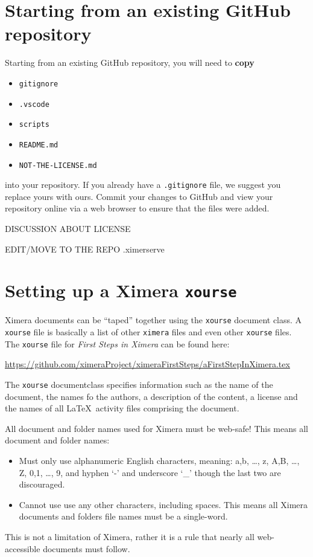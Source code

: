 \documentclass{ximera}
\begin{document}
\section{Starting from an existing GitHub repository}

Starting from an existing GitHub repository, you will need to \textbf{copy}
\begin{itemize}
  \item \texttt{gitignore}
  \item \texttt{.vscode}
  \item \texttt{scripts}
  \item \texttt{README.md}
  \item \texttt{NOT-THE-LICENSE.md}
\end{itemize}
into your repository. If you already have a \verb|.gitignore| file, we suggest
you replace yours with ours. Commit your changes to GitHub and view your
repository online via a web browser to ensure that the files were added.

DISCUSSION ABOUT LICENSE

EDIT/MOVE TO THE REPO .ximerserve

\section{Setting up a Ximera \texttt{xourse}}

Ximera documents can be ``taped'' together using the \texttt{xourse} document
class.
A \verb|xourse| file is basically a list of other \verb|ximera| files and even
other \verb|xourse| files.
The \verb|xourse| file for \textit{First Steps in Ximera} can be found here:
\begin{center}

  \url{https://github.com/ximeraProject/ximeraFirstSteps/aFirstStepInXimera.tex}
\end{center}
The \verb!xourse! documentclass specifies information such as the name of the
document, the names fo the authors, a description of
the content, a license and the names of all \LaTeX\ activity files comprising
the
document.

\begin{warning}
  All document and folder names used for Ximera must be web-safe! This means
  all document and folder names:
  \begin{itemize}
    \item Must only use alphanumeric English characters, meaning: a,b, \dots,
          z, A,B, \dots, Z, 0,1, \dots, 9, and hyphen `-' and underscore `\_'
          though the
          last two are discouraged.
    \item Cannot use use any other characters, including spaces. This means all
          Ximera documents and folders file names must be a single-word.
  \end{itemize}
  This is not a limitation of Ximera, rather it is a rule that nearly all
  web-accessible documents must follow.
\end{warning}
\end{document}
